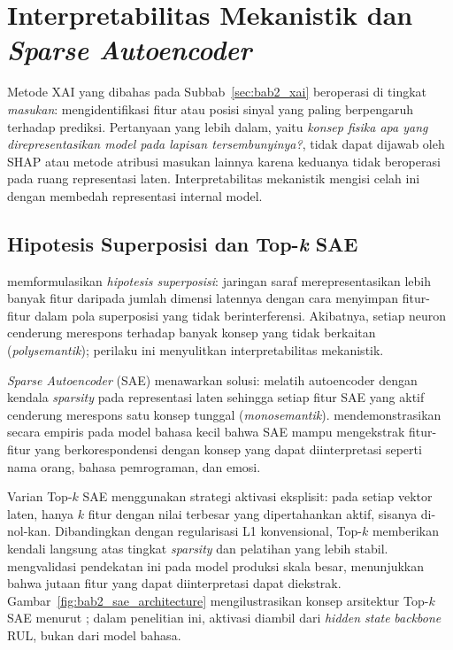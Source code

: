 \section{Interpretabilitas Mekanistik dan \emph{Sparse Autoencoder}}
\label{sec:bab2_mekanistik}

Metode XAI yang dibahas pada Subbab~\ref{sec:bab2_xai} beroperasi di tingkat
\emph{masukan}: mengidentifikasi fitur atau posisi sinyal yang paling berpengaruh
terhadap prediksi. Pertanyaan yang lebih dalam, yaitu \emph{konsep fisika apa yang
direpresentasikan model pada lapisan tersembunyinya?}, tidak dapat dijawab
oleh SHAP atau metode atribusi masukan lainnya karena keduanya tidak beroperasi
pada ruang representasi laten. Interpretabilitas mekanistik mengisi celah ini
dengan membedah representasi internal model.

\subsection{Hipotesis Superposisi dan Top-\textit{k} SAE}
\label{subsec:bab2_superposisi_sae}

 memformulasikan \emph{hipotesis
superposisi}: jaringan saraf merepresentasikan lebih banyak fitur daripada
jumlah dimensi latennya dengan cara menyimpan fitur-fitur dalam pola superposisi
yang tidak berinterferensi. Akibatnya, setiap neuron cenderung merespons
terhadap banyak konsep yang tidak berkaitan (\emph{polysemantik}); perilaku ini
menyulitkan interpretabilitas mekanistik.

\emph{Sparse Autoencoder} (SAE)  menawarkan solusi:
melatih autoencoder dengan kendala \emph{sparsity} pada representasi laten
sehingga setiap fitur SAE yang aktif cenderung merespons satu konsep tunggal
(\emph{monosemantik}).  mendemonstrasikan
secara empiris pada model bahasa kecil bahwa SAE mampu mengekstrak fitur-fitur
yang berkorespondensi dengan konsep yang dapat diinterpretasi seperti nama
orang, bahasa pemrograman, dan emosi.

Varian Top-$k$ SAE  menggunakan strategi aktivasi
eksplisit: pada setiap vektor laten, hanya $k$ fitur dengan nilai terbesar yang
dipertahankan aktif, sisanya di-nol-kan. Dibandingkan dengan regularisasi L1
konvensional, Top-$k$ memberikan kendali langsung atas tingkat \emph{sparsity}
dan pelatihan yang lebih stabil.  mengvalidasi
pendekatan ini pada model produksi skala besar, menunjukkan bahwa jutaan fitur
yang dapat diinterpretasi dapat diekstrak.
Gambar~\ref{fig:bab2_sae_architecture} mengilustrasikan konsep arsitektur
Top-$k$ SAE menurut ; dalam penelitian ini,
aktivasi diambil dari \emph{hidden state} \emph{backbone} RUL, bukan dari
model bahasa.

